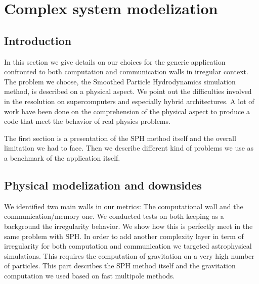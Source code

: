 \chapter{Complex system modelization}

\section{Introduction}
In this section we give details on our choices for the generic application confronted to both computation and communication walls in irregular context. 
The problem we choose, the Smoothed Particle Hydrodynamics simulation method, is described on a physical aspect.
We point out the difficulties involved in the resolution on supercomputers and especially hybrid architectures.  
A lot of work have been done on the comprehension of the physical aspect to produce a code that meet the behavior of real physics problems.

The first section is a presentation of the SPH method itself and the overall limitation we had to face. 
Then we describe different kind of problems we use as a benchmark of the application itself. 

\section{Physical modelization and downsides}
We identified two main walls in our metrics:
The computational wall and the communication/memory one.
We conducted tests on both keeping as a background the irregularity behavior.
We show how this is perfectly meet in the same problem with SPH.
In order to add another complexity layer in term of irregularity for both computation and communication we targeted astrophysical simulations. 
This requires the computation of gravitation on a very high number of particles. 
This part describes the SPH method itself and the gravitation computation we used based on fast multipole methods. 

